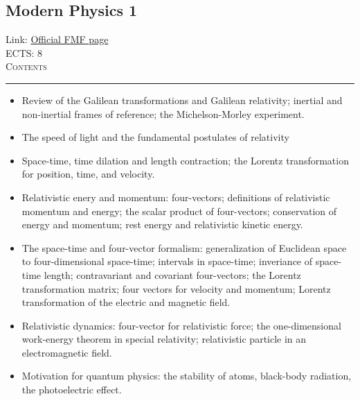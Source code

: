 \documentclass[11pt, a4paper]{article}
\newenvironment{course}[3]{
\subsection{#1}%
Link: \href{#2}{Official FMF page}\\%
ECTS: #3%
\vspace{1ex}
\\
{\large \textsc{Contents}}\\[-0.9ex]%
\rule{\textwidth}{0.5pt}
\vspace{-3ex}
}
{}
\newenvironment{chapter}[1]{
\begin{tcolorbox}[title=#1, breakable]
}
{\end{tcolorbox}}
\begin{document}
\begin{course}{Modern Physics 1}{https://www.fmf.uni-lj.si/en/study-physics/programmes/1fiz/2020/7000777/courses/1161/}{8}
    \label{modern-physics-1}

    \begin{chapter}{Special theory of relativity}

        \begin{itemize}
        
            \item Review of the Galilean transformations and Galilean relativity; inertial and non-inertial frames of reference; the Michelson-Morley experiment.

            \item The speed of light and the fundamental postulates of relativity

            \item Space-time, time dilation and length contraction; the Lorentz transformation for position, time, and velocity.

            \item Relativistic enery and momentum: four-vectors; definitions of relativistic momentum and energy; the scalar product of four-vectors; conservation of energy and momentum; rest energy and relativistic kinetic energy.

            \item The space-time and four-vector formalism: generalization of Euclidean space to four-dimensional space-time; intervals in space-time; inveriance of space-time length; contravariant and covariant four-vectors; the Lorentz transformation matrix; four vectors for velocity and momentum; Lorentz transformation of the electric and magnetic field.

            \item Relativistic dynamics: four-vector for relativistic force; the one-dimensional work-energy theorem in special relativity; relativistic particle in an electromagnetic field.


        \end{itemize}
        
    \end{chapter}

    \begin{chapter}{Quantum physics}

        \begin{itemize}
        
            \item Motivation for quantum physics: the stability of atoms, black-body radiation, the photoelectric effect.


\end{itemize}
\end{chapter}
\end{course}
\end{document}
